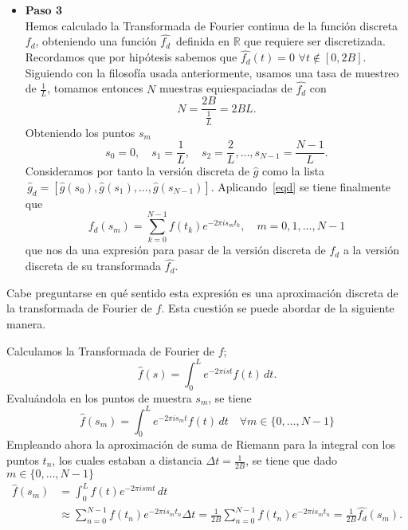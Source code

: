 \begin{itemize}
\item  \textbf{Paso 3}\\
Hemos calculado la Transformada de Fourier continua de la función discreta $f_d$, obteniendo una función $\widehat{f_d} \,$ definida en $\mathbb{R}$ que requiere ser discretizada. Recordamos que por hipótesis sabemos que $\widehat{f_d}(t) = 0 \, \, \forall t \notin [0,2B]$. Siguiendo con la filosofía usada anteriormente, usamos una tasa de muestreo de $\frac{1}{L}$, tomamos entonces $N$ muestras equiespaciadas de $\widehat{f_d}$   con 
\begin{equation}
    N = \frac{2B}{\frac{1}{L}} = 2BL.
\end{equation}
Obteniendo  los puntos $s_m$
\begin{equation}
    s_0 = 0, \quad s_1 = \frac{1}{L}, \quad s_2 = \frac{2}{L}, \ldots, s_{N-1} = \frac{N-1}{L}. 
\end{equation}
Consideramos por tanto la versión discreta de $\widehat{g}$ como la lista \( \, \widehat{g}_d =[\widehat{g} (s_0), \widehat{g} (s_1), \ldots, \widehat{g} (s_{N-1})] \). Aplicando~\eqref{eqd} se tiene finalmente que 
\begin{equation}\label{eq:tras}
    \widehat{f_d}(s_m) = \sum_{k=0}^{N-1} f(t_k) e^{-2\pi i s_m t_k}, \quad m = 0,1,\ldots,N-1
\end{equation} 
que nos da una expresión para pasar de la versión discreta de $f_d$ a la versión discreta de su transformada $\widehat{f_d}$.
\end{itemize}
\noindent Cabe preguntarse en qué sentido esta expresión es una aproximación discreta de la transformada de Fourier de $f$. Esta cuestión se puede abordar de la siguiente manera.

\noindent Calculamos la Transformada de Fourier de $f$;
\begin{equation}
  \widehat{f}(s)= \int_{0}^{L} e^{-2\pi ist} f(t) \, dt.  
\end{equation}
Evaluándola en los puntos de muestra $s_m$, se tiene
\begin{equation}
   \widehat{f}(s_m) = \int_{0}^{L} e^{-2\pi is_m t} f(t) \, dt \quad  \forall m \in \{0, \ldots,N-1\}
\end{equation}
Empleando ahora la aproximación de suma de Riemann para la integral con los puntos $t_n$, los cuales estaban a distancia  $\Delta t = \frac{1}{2B}$,  se tiene que dado $m \in \{0, \ldots,N-1\}$
\begin{equation} \label{eq:di}
\begin{aligned}
\widehat{f}(s_m) &= \int_{0}^{L} f(t)e^{-2\pi ism t} \, dt \\
&\approx  \sum_{n=0}^{N-1} f(t_n) e^{-2\pi is_m t_n} \Delta t = \frac{1}{2B} \sum_{n=0}^{N-1} f(t_n) e^{-2\pi is_m t_n} = \frac{1}{2B} \widehat{f_d}(s_m).
\end{aligned}
\end{equation}


